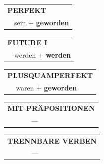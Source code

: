 \documentclass[10pt,a4paper]{revtex4-2}
\begin{document}
\begin{verbbox-acc}
    \vspace{10pt}
 
    \begin{tabular}{rl}
     \multicolumn{2}{l}{\textbf{PERFEKT}}\\
   & sein + \textbf{geworden}\\
  \end{tabular}
\hfill
   \begin{tabular}{rl}
   
    \multicolumn{2}{l}{\textbf{FUTURE I} }\\
    &werden + \textbf{werden}\\
 
  \end{tabular}
\hfill
   \begin{tabular}{rl}
      \multicolumn{2}{l}{\textbf{PLUSQUAMPERFEKT}}\\
   & waren + \textbf{geworden}\\
  \end{tabular}
  
\vspace{10pt}

\begin{tabular}{lll}
\multicolumn{3}{l}{\textbf{MIT PRÄPOSITIONEN}}\\
& ---\\
\end{tabular}
\hfill
\begin{tabular}{lll}
\multicolumn{3}{l}{\textbf{TRENNBARE VERBEN}}\\
& ---\\
\end{tabular}

\vspace{-5pt}

\end{verbbox-acc}
\end{document}
